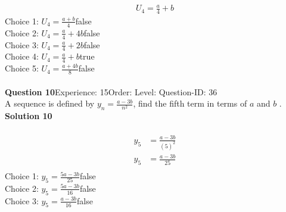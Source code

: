 \documentclass{article}
\begin{document}
\\[-35pt]\begin{align*}
U_4=\displaystyle\frac{a}{4}+b
\end{align*}
Choice 1: \hspace{20pt}$U_4=\displaystyle\frac{a+b}{4}$\hspace{20pt}false\\
Choice 2: \hspace{20pt}$U_4=\displaystyle\frac{a}{4}+4b$\hspace{20pt}false\\
Choice 3: \hspace{20pt}$U_4=\displaystyle\frac{a}{4}+2b$\hspace{20pt}false\\
Choice 4: \hspace{20pt}$U_4=\displaystyle\frac{a}{4}+b$\hspace{20pt}true\\
Choice 5: \hspace{20pt}$U_4=\displaystyle\frac{a+4b}{8}$\hspace{20pt}false\\
\\[4pt]
\noindent\textbf{Question 10}\hspace{20pt}Experience: 15\hspace{20pt}Order: \hspace{20pt}Level: \hspace{20pt}Question-ID: 36\\[2pt]
A sequence is defined by $y_n=\displaystyle\frac{a-3b}{n^2}$, find the fifth term in terms of $a$ and $b$ .\\[4pt]
\noindent\textbf{Solution 10}\\[2pt]
\\[-35pt]\begin{align*}
y_5&=\displaystyle\frac{a-3b}{(5)^2}\\[2pt]
y_5&=\displaystyle\frac{a-3b}{25}\\[2pt]
\end{align*}
Choice 1: \hspace{20pt}$y_5=\displaystyle\frac{5a-3b}{25}$\hspace{20pt}false\\
Choice 2: \hspace{20pt}$y_5=\displaystyle\frac{5a-3b}{16}$\hspace{20pt}false\\
Choice 3: \hspace{20pt}$y_5=\displaystyle\frac{a-3b}{16}$\hspace{20pt}false\\
\end{document}
